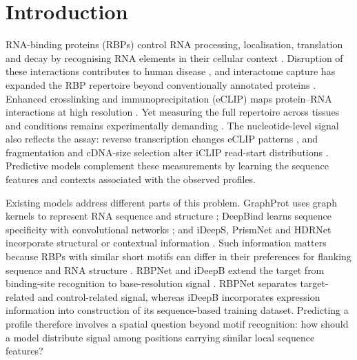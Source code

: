 \documentclass[webpdf,contemporary,large]{oup-authoring-template}
\begin{document}
\maketitle

\section{Introduction}

RNA-binding proteins (RBPs) control RNA processing, localisation, translation and decay by recognising RNA elements in their cellular context \citep{glisovic2008rbp,gerstberger2014census,corley2020rbp}. Disruption of these interactions contributes to human disease \citep{hentze2018brave,gebauer2021disease}, and interactome capture has expanded the RBP repertoire beyond conventionally annotated proteins \citep{castello2012atlas}. Enhanced crosslinking and immunoprecipitation (eCLIP) maps protein--RNA interactions at high resolution \citep{vannostrand2016eclip,vannostrand2020map}. Yet measuring the full repertoire across tissues and conditions remains experimentally demanding \citep{hafner2021clip,ramanathan2019methods}. The nucleotide-level signal also reflects the assay: reverse transcription changes eCLIP patterns \citep{vannostrand2017variation}, and fragmentation and cDNA-size selection alter iCLIP read-start distributions \citep{haberman2017iclip}. Predictive models complement these measurements by learning the sequence features and contexts associated with the observed profiles.

Existing models address different parts of this problem. GraphProt uses graph kernels to represent RNA sequence and structure \citep{maticzka2014graphprot}; DeepBind learns sequence specificity with convolutional networks \citep{alipanahi2015deepbind}; and iDeepS, PrismNet and HDRNet incorporate structural or contextual information \citep{pan2018ideeps,sun2021prismnet,Zhu2023HDRNet}. Such information matters because RBPs with similar short motifs can differ in their preferences for flanking sequence and RNA structure \citep{dominguez2018rbpcontext}. RBPNet and iDeepB extend the target from binding-site recognition to base-resolution signal \citep{horlacher2023rbpnet,liu2025ideepb}. RBPNet separates target-related and control-related signal, whereas iDeepB incorporates expression information into construction of its sequence-based training dataset. Predicting a profile therefore involves a spatial question beyond motif recognition: how should a model distribute signal among positions carrying similar local sequence features?
\end{document}
